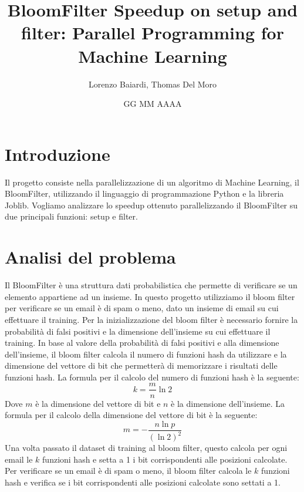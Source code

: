 \documentclass[11pt]{article}
\title{BloomFilter Speedup on setup and filter: Parallel Programming for Machine Learning}
\author{Lorenzo Baiardi, Thomas Del Moro}
\date{GG MM AAAA}
\begin{document}
    \maketitle
    \clearpage


    \section{Introduzione}\label{sec:introduzione}
    Il progetto consiste nella parallelizzazione di un algoritmo di Machine Learning, il BloomFilter, utilizzando il linguaggio di programmazione Python e la libreria Joblib.
    Vogliamo analizzare lo speedup ottenuto parallelizzando il BloomFilter su due principali funzioni: setup e filter.

    \section{Analisi del problema}\label{sec:analisi-del-problema}
    Il BloomFilter è una struttura dati probabilistica che permette di verificare se un elemento appartiene ad un insieme.
    In questo progetto utilizziamo il bloom filter per verificare se un email è di spam o meno, dato un insieme di email su cui effettuare il training.
    Per la inizializzazione del bloom filter è necessario fornire la probabilità di falsi positivi e la dimensione dell'insieme su cui effettuare il training.
    In base al valore della probabilità di falsi positivi e alla dimensione dell'insieme, il bloom filter calcola il numero di funzioni hash da utilizzare e la dimensione del vettore di bit che permetterà
    di memorizzare i risultati delle funzioni hash.
    La formula per il calcolo del numero di funzioni hash è la seguente:
    \begin{equation}
        k = \frac{m}{n} \ln{2}\label{eq:num_hash}
    \end{equation}
    Dove $m$ è la dimensione del vettore di bit e $n$ è la dimensione dell'insieme.
    La formula per il calcolo della dimensione del vettore di bit è la seguente:
    \begin{equation}
        m = -\frac{n \ln{p}}{(\ln{2})^2}\label{eq:dim_bit}
    \end{equation}
    Una volta passato il dataset di training al bloom filter, questo calcola per ogni email le $k$ funzioni hash e setta a 1 i bit corrispondenti alle posizioni calcolate.
    Per verificare se un email è di spam o meno, il bloom filter calcola le $k$ funzioni hash e verifica se i bit corrispondenti alle posizioni calcolate sono settati a 1.
\end{document}

